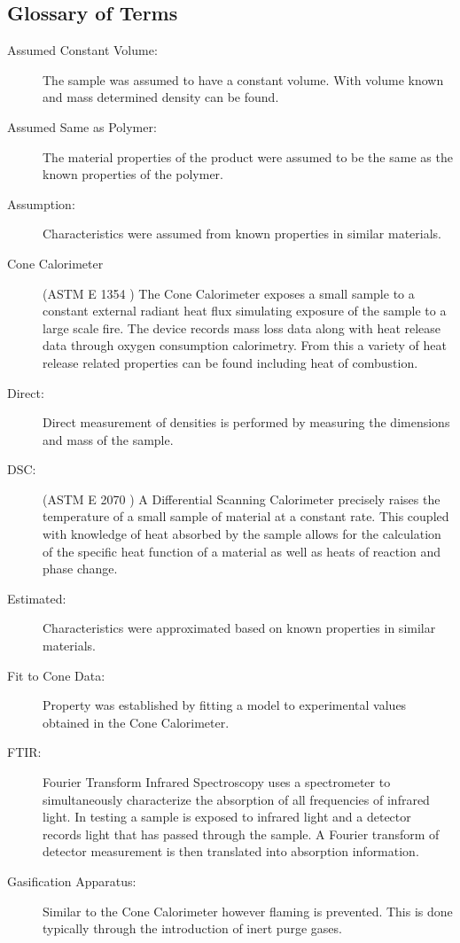 \clearpage

\subsection{Glossary of Terms}
\label{glossary}

\begin{description}
\item[Assumed Constant Volume:] The sample was assumed to have a constant volume. With volume known and mass determined density can be found.
\item[Assumed Same as Polymer:] The material properties of the product were assumed to be the same as the known properties of the polymer.
\item[Assumption:]  Characteristics were assumed from known properties in similar materials.
\item[Cone Calorimeter] (ASTM E 1354 \cite{conecal}) The Cone Calorimeter exposes a small sample to a constant external radiant heat flux simulating exposure of the sample to a large scale fire. The device records mass loss data along with heat release data through oxygen consumption calorimetry. From this a variety of heat release related properties can be found including heat of combustion.
\item[Direct:]  Direct measurement of densities is performed by measuring the dimensions and mass of the sample.
\item[DSC:] (ASTM E 2070 \cite{diffscancal}) A Differential Scanning Calorimeter precisely raises the temperature of a small sample of material at a constant rate. This coupled with knowledge of heat absorbed by the sample allows for the calculation of the specific heat function of a material as well as heats of reaction and phase change.
\item[Estimated:] Characteristics were approximated based on known properties in similar materials.
\item[Fit to Cone Data:] Property was established by fitting a model to experimental values obtained in the Cone Calorimeter.
\item[FTIR:] Fourier Transform Infrared Spectroscopy uses a spectrometer to simultaneously characterize the absorption of all frequencies of infrared light. In testing a sample is exposed to infrared light and a detector records light that has passed through the sample. A Fourier transform of detector measurement is then translated into absorption information.
\item[Gasification Apparatus:] Similar to the Cone Calorimeter however flaming is prevented. This is done typically through the introduction of inert purge gases.

\end{description}
